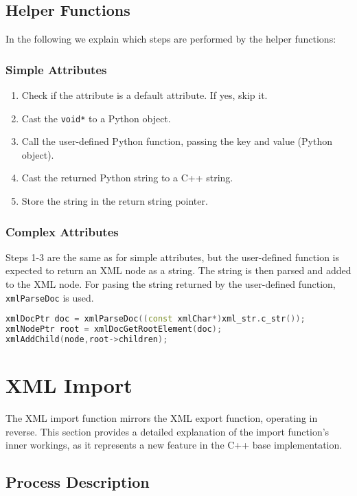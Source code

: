 \subsection{Helper Functions}

In the following we explain which steps are performed by the helper functions:

\subsubsection{Simple Attributes}
\begin{enumerate}
\item Check if the attribute is a default attribute. If yes, skip it.
\item Cast the \verb|void*| to a Python object.
\item Call the user-defined Python function, passing the key and value (Python object).
\item Cast the returned Python string to a C++ string.
\item Store the string in the return string pointer.
\end{enumerate}

\subsubsection{Complex Attributes}

Steps 1-3 are the same as for simple attributes, but the user-defined function is expected to return an XML node as a string. The string is then parsed and added to the XML node. For pasing the string returned by the user-defined function, \verb|xmlParseDoc| is used.

\begin{lstlisting}[language=C++, xleftmargin=4em, frame = single]
xmlDocPtr doc = xmlParseDoc((const xmlChar*)xml_str.c_str());
xmlNodePtr root = xmlDocGetRootElement(doc);
xmlAddChild(node,root->children);
\end{lstlisting}

\section{XML Import}

The XML import function mirrors the XML export function, operating in reverse. This section provides a detailed explanation of the import function's inner workings, as it represents a new feature in the C++ base implementation.

\subsection{Process Description}

